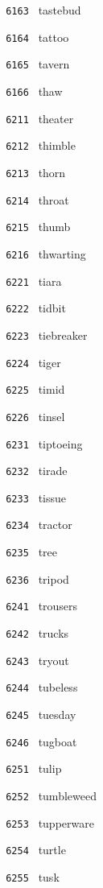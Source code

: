 \documentclass[11pt]{article}
\begin{document}
\begin{multicols}{6}
\noindent \texttt{ 6163 } tastebud  \par
\noindent \texttt{ 6164 } tattoo  \par
\noindent \texttt{ 6165 } tavern  \par
\noindent \texttt{ 6166 } thaw  \par
\noindent \texttt{ 6211 } theater  \par
\noindent \texttt{ 6212 } thimble  \par
\noindent \texttt{ 6213 } thorn  \par
\noindent \texttt{ 6214 } throat  \par
\noindent \texttt{ 6215 } thumb  \par
\noindent \texttt{ 6216 } thwarting  \par
\noindent \texttt{ 6221 } tiara  \par
\noindent \texttt{ 6222 } tidbit  \par
\noindent \texttt{ 6223 } tiebreaker  \par
\noindent \texttt{ 6224 } tiger  \par
\noindent \texttt{ 6225 } timid  \par
\noindent \texttt{ 6226 } tinsel  \par
\noindent \texttt{ 6231 } tiptoeing  \par
\noindent \texttt{ 6232 } tirade  \par
\noindent \texttt{ 6233 } tissue  \par
\noindent \texttt{ 6234 } tractor  \par
\noindent \texttt{ 6235 } tree  \par
\noindent \texttt{ 6236 } tripod  \par
\noindent \texttt{ 6241 } trousers  \par
\noindent \texttt{ 6242 } trucks  \par
\noindent \texttt{ 6243 } tryout  \par
\noindent \texttt{ 6244 } tubeless  \par
\noindent \texttt{ 6245 } tuesday  \par
\noindent \texttt{ 6246 } tugboat  \par
\noindent \texttt{ 6251 } tulip  \par
\noindent \texttt{ 6252 } tumbleweed  \par
\noindent \texttt{ 6253 } tupperware  \par
\noindent \texttt{ 6254 } turtle  \par
\noindent \texttt{ 6255 } tusk  \par

\end{multicols}
\end{document}
